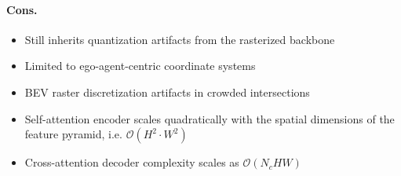 \paragraph{Cons.}
\begin{itemize}[leftmargin=*, label=\redominus]
  \item Still inherits quantization artifacts from the rasterized backbone
  \item Limited to ego-agent-centric coordinate systems
  \item BEV raster discretization artifacts in crowded intersections
  \item Self-attention encoder scales quadratically with the spatial dimensions of the feature pyramid, i.e. \(\mathcal{O}(H^2 \cdot W^2)\)
  \item Cross-attention decoder complexity scales as \(\mathcal{O}(N_c H W)\)
\end{itemize}




\newpage